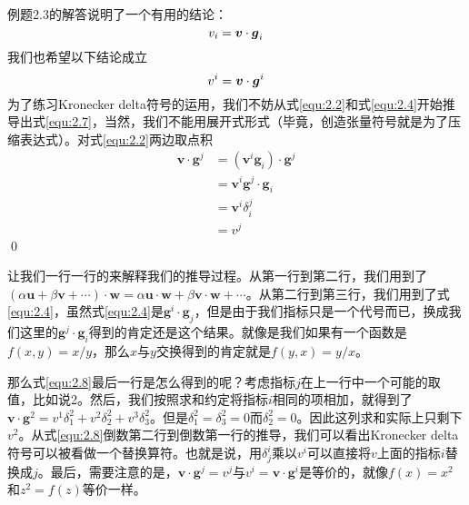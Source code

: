 例题2.3的解答说明了一个有用的结论：
\begin{equation}
    v_i=\boldsymbol{v}\cdot \boldsymbol{g}_i
\end{equation}
我们也希望以下结论成立
\begin{equation}\label{equ:2.7}
    v^i=\boldsymbol{v}\cdot \boldsymbol{g}^i
\end{equation}
为了练习Kronecker delta符号的运用，我们不妨从式\eqref{equ:2.2}和式\eqref{equ:2.4}开始推导出式\eqref{equ:2.7}，当然，我们不能用展开式形式（毕竟，创造张量符号就是为了压缩表达式）。对式\eqref{equ:2.2}两边取点积
\begin{align}
	\boldsymbol{v}\cdot \boldsymbol{g}^j&=\left( \boldsymbol{v}^i\boldsymbol{g}_i \right) \cdot \boldsymbol{g}^j\nonumber\\
	&=\boldsymbol{v}^i\boldsymbol{g}^j\cdot \boldsymbol{g}_i\nonumber\\
	&=\boldsymbol{v}^i\delta _{i}^{j}\nonumber\\
	&=v^j\label{equ:2.8}
\end{align}
\qed

让我们一行一行的来解释我们的推导过程。从第一行到第二行，我们用到了\linebreak$\left( \alpha \boldsymbol{u}+\beta \boldsymbol{v}+\cdots \right) \cdot \boldsymbol{w}=\alpha \boldsymbol{u}\cdot \boldsymbol{w}+\beta \boldsymbol{v}\cdot \boldsymbol{w}+\cdots $。从第二行到第三行，我们用到了式\eqref{equ:2.4}，虽然式\eqref{equ:2.4}是$\boldsymbol{g}^i\cdot \boldsymbol{g}_j$，但是由于我们指标只是一个代号而已，换成我们这里的$\boldsymbol{g}^j\cdot \boldsymbol{g}_i$得到的肯定还是这个结果。就像是我们如果有一个函数是$f\left( x,y \right) =x/y$，那么$x$与$y$交换得到的肯定就是$f\left( y,x \right) =y/x$。

那么式\eqref{equ:2.8}最后一行是怎么得到的呢？考虑指标$j$在上一行中一个可能的取值，比如说2。然后，我们按照求和约定将指标$i$相同的项相加，就得到了$\boldsymbol{v}\cdot \boldsymbol{g}^2=v^1\delta _{1}^{2}+v^2\delta _{2}^{2}+v^3\delta _{3}^{2}$。但是$\delta _{1}^{2}=\delta _{3}^{2}=0$而$\delta^{2}_{2}=0$。因此这列求和实际上只剩下$v^2$。从式\eqref{equ:2.8}倒数第二行到倒数第一行的推导，我们可以看出Kronecker delta符号可以被看做一个替换算符。也就是说，用$\delta^{i}_{j}$乘以$v^{i}$可以直接将$v$上面的指标$i$替换成$j$。最后，需要注意的是，$\boldsymbol{v}\cdot \boldsymbol{g}^j=v^j$与$v^i=\boldsymbol{v}\cdot \boldsymbol{g}^i$是等价的，就像$f\left( x \right) =x^2$和$z^2=f\left( z \right) $等价一样。

